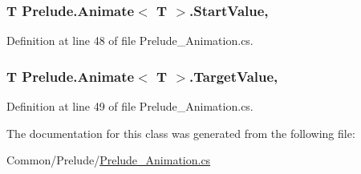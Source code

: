 \hypertarget{class_prelude_1_1_animate_3_01_t_01_4_a295050c7a6a66cd5c07303c6de4488e2}{
\subsubsection[{Start\+Value}]{\setlength{\rightskip}{0pt plus 5cm}T Prelude.\+Animate$<$ T $>$.Start\+Value\hspace{0.3cm}{\ttfamily [get]}, {\ttfamily [set]}}}\label{class_prelude_1_1_animate_3_01_t_01_4_a295050c7a6a66cd5c07303c6de4488e2}


Definition at line 48 of file Prelude\+\_\+\+Animation.\+cs.

\hypertarget{class_prelude_1_1_animate_3_01_t_01_4_a283c75308a7f43c7508125aafed4db86}{
\subsubsection[{Target\+Value}]{\setlength{\rightskip}{0pt plus 5cm}T Prelude.\+Animate$<$ T $>$.Target\+Value\hspace{0.3cm}{\ttfamily [get]}, {\ttfamily [set]}}}\label{class_prelude_1_1_animate_3_01_t_01_4_a283c75308a7f43c7508125aafed4db86}


Definition at line 49 of file Prelude\+\_\+\+Animation.\+cs.



The documentation for this class was generated from the following file\+:\begin{DoxyCompactItemize}
\item 
Common/\+Prelude/\hyperlink{_prelude___animation_8cs}{Prelude\+\_\+\+Animation.\+cs}\end{DoxyCompactItemize}

